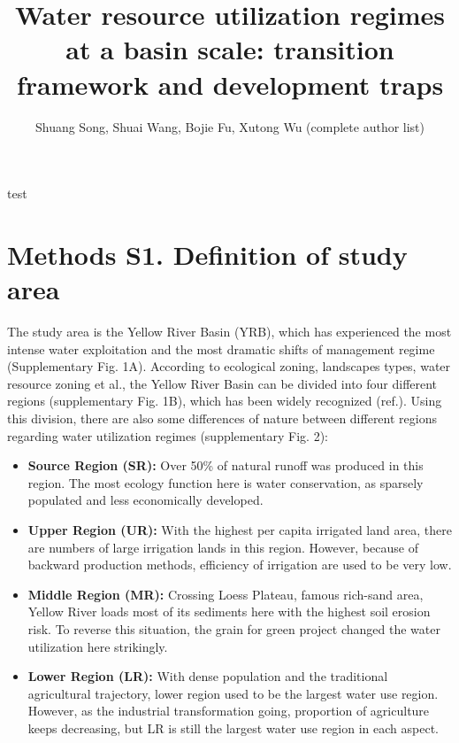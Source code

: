 \documentclass[9pt,twoside,lineno]{pnas-new}
\title{Water resource utilization regimes at a basin scale: transition framework and development traps}
\author{Shuang Song, Shuai Wang, Bojie Fu, Xutong Wu (complete author list)}
\begin{document}

\maketitle

\SItext test



\section*{Methods S1. Definition of study area}
The study area is the Yellow River Basin (YRB), which has experienced the most intense water exploitation and the most dramatic shifts of management regime (Supplementary Fig. 1A). According to ecological zoning, landscapes types, water resource zoning et al., the Yellow River Basin can be divided into four different regions (supplementary Fig. 1B), which has been widely recognized (ref.). Using this division, there are also some differences of nature between different regions regarding water utilization regimes (supplementary Fig. 2):
\begin{itemize}
    \item \textbf{Source Region (SR):} Over 50\% of natural runoff was produced in this region. The most ecology function here is water conservation, as sparsely populated and less economically developed.
    \item \textbf{Upper Region (UR):} With the highest per capita irrigated land area, there are numbers of large irrigation lands in this region. However, because of backward production methods, efficiency of irrigation are used to be very low.
    \item \textbf{Middle Region (MR):} Crossing Loess Plateau, famous rich-sand area, Yellow River loads most of its sediments here with the highest soil erosion risk. To reverse this situation, the grain for green project changed the water utilization here strikingly.
    \item \textbf{Lower Region (LR):} With dense population and the traditional agricultural trajectory, lower region used to be the largest water use region. However, as the industrial transformation going, proportion of agriculture keeps decreasing, but LR is still the largest water use region in each aspect.
\end{itemize}
\end{document}

